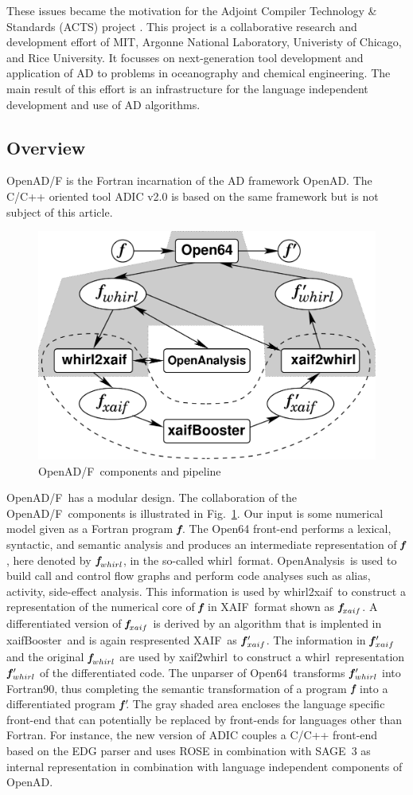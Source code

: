 \documentclass[11pt]{article}
\newcommand{\OpenADF}{OpenAD/F}
\newcommand{\OpenAD}{OpenAD}
\newcommand{\OpenAnalysis}{OpenAnalysis}
\newcommand{\OpenSixtyFour}{Open64}
\newcommand{\xaif}{XAIF}
\newcommand{\xaifBooster}{xaifBooster}
\newcommand{\whirl}{whirl}
\newcommand{\whirlToxaif}{whirl2xaif}
\newcommand{\xaifTowhirl}{xaif2whirl}
\newcommand{\bmf}{\mbox{\bf\em f}}
\newcommand{\bmfp}{\mbox{\bf\em f$\,^\prime\!\!$}}
\newcommand{\reffig}[1]{{Fig.~\ref{#1}}}
\begin{document}
These issues became the motivation for the 
Adjoint Compiler Technology \& Standards (ACTS) project \cite{actsWeb}.
This project is a collaborative
research and development effort of MIT, Argonne National Laboratory, 
Univeristy of Chicago, and Rice University. 
It focusses on  next-generation tool development and 
application of AD to problems in oceanography and chemical engineering.
The main result of this effort is an infrastructure for the language independent 
development and use of AD algorithms. 

\subsection{Overview}
\OpenADF \cite{openadWeb}
is the Fortran incarnation of the AD framework \OpenAD.
The C/C++ oriented tool ADIC v2.0 \cite{adicWeb}
is based on the same framework but is 
not subject of this article.
\begin{figure}
\centering\includegraphics[width=.5\textwidth]{overview}
\caption{\OpenADF\ components and pipeline} \label{fig:overview}
\end{figure}
\OpenADF\ has  a modular design. 
The collaboration  of the \OpenADF\ components is illustrated in 
\reffig{fig:overview}.
Our input is some numerical model given as a Fortran program 
$\bmf$.
The \OpenSixtyFour\cite{open64Web}
front-end performs a lexical, 
syntactic, and semantic analysis and produces an 
intermediate representation of $\bmf$, here denoted by $\bmf_{\whirl}$, 
in the so-called \whirl\ format.
\OpenAnalysis\ is used to build call and control flow graphs and  perform 
code analyses such as alias, activity, side-effect analysis.
This information is used by 
\whirlToxaif\ to construct a representation of the numerical core of $\bmf$ in
\xaif\ format shown as $\bmf_{xaif}$.  
A differentiated version of $\bmf_{xaif}$ is derived by an 
algorithm that is implented in \xaifBooster\ and is again respresented 
\xaif\ as $\bmfp_{xaif}$.
The information in $\bmfp_{xaif}$ and the original $\bmf_{\whirl}$ are used by 
\xaifTowhirl\ to construct a 
\whirl\ representation $\bmfp_{\whirl}$ of the differentiated code. 
The unparser of 
\OpenSixtyFour\ transforms $\bmfp_{\whirl}$ into Fortran90, thus completing
the semantic transformation of a program $\bmf$ into
a differentiated program $\bmfp$.
The gray shaded area encloses the language specific front-end that can potentially
be replaced by front-ends for languages other than Fortran. 
For instance, the new version of ADIC \cite{HoNo01} couples a C/C++ 
front-end 
based on the EDG parser \cite{edgWeb} and uses ROSE in combination with SAGE~3 \cite{roseWeb} 
as internal representation in combination with language independent components of \OpenAD.
\end{document}
